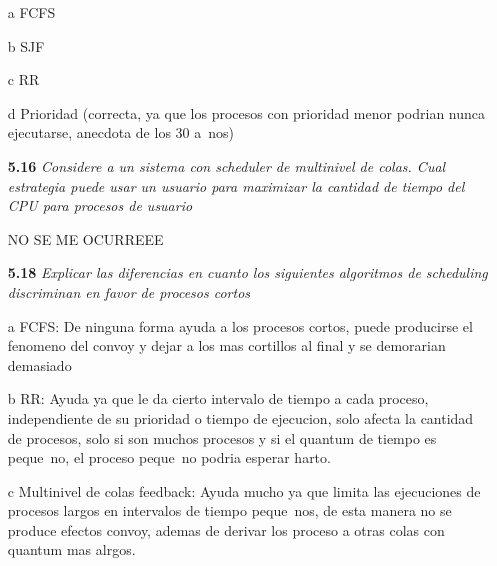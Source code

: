 \begin{itemize}
\item[a] FCFS
\item[b] SJF
\item[c] RR
\item[d] Prioridad (correcta, ya que los procesos con prioridad menor podrian nunca ejecutarse, anecdota de los 30 a~nos)

\item[\textbf{5.16}]\emph{Considere a un sistema con scheduler de multinivel de colas. Cual estrategia puede usar un usuario para maximizar la cantidad de tiempo del CPU para procesos de usuario}

NO SE ME OCURREEE

\item[\textbf{5.18}]\emph{Explicar las diferencias en cuanto los siguientes algoritmos de scheduling discriminan en favor de procesos cortos}

\item[a] FCFS: De ninguna forma ayuda a los procesos cortos, puede producirse el fenomeno del convoy y dejar a los mas cortillos al final y se demorarian demasiado
\item[b] RR: Ayuda ya que le da cierto intervalo de tiempo a cada proceso, independiente de su prioridad o tiempo de ejecucion, solo afecta la cantidad de procesos, solo si son muchos procesos y si el quantum de tiempo es peque~no, el proceso peque~no podria esperar harto.
\item[c] Multinivel de colas feedback: Ayuda mucho ya que limita las ejecuciones de procesos largos en intervalos de tiempo peque~nos, de esta manera no se produce efectos convoy, ademas de derivar los proceso a otras colas con quantum mas alrgos.

\end{itemize}
